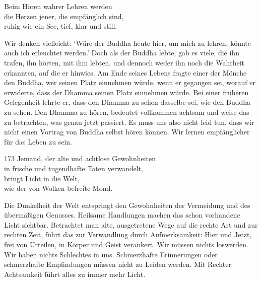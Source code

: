 
\begin{dhpVerse}{82}
\label{dhp-82}
Beim Hören wahrer Lehren werden\\ 
die Herzen jener, die empfänglich sind,\\ 
ruhig wie ein See, tief, klar und still. 
\end{dhpVerse}

\begin{dhpRefl}

Wir denken vielleicht: `Wäre der Buddha heute hier, um mich zu lehren, könnte
auch ich erleuchtet werden.’ Doch als der Buddha lebte, gab es viele, die ihn
trafen, ihn hörten, mit ihm lebten, und dennoch weder ihn noch die Wahrheit
erkannten, auf die er hinwies. Am Ende seines Lebens fragte einer der Mönche
den Buddha, wer seinen Platz einnehmen würde, wenn er gegangen sei, worauf er
erwiderte, dass der Dhamma seinen Platz einnehmen würde. Bei einer früheren
Gelegenheit lehrte er, dass den Dhamma zu sehen dasselbe sei, wie den Buddha
zu sehen. Den Dhamma zu hören, bedeutet vollkommen achtsam und weise das zu
betrachten, was genau jetzt passiert. Es muss uns also nicht leid tun, dass
wir nicht einen Vortrag von Buddha selbst hören können. Wir lernen
empfänglicher für das Leben zu sein.

\end{dhpRefl}


\begin{dhpVerse}{173}
\label{dhp-173}
Jemand, der alte und achtlose Gewohnheiten\\ 
in frische und tugendhafte Taten verwandelt,\\ 
bringt Licht in die Welt,\\ 
wie der von Wolken befreite Mond. 
\end{dhpVerse}

\begin{dhpRefl}

Die Dunkelheit der Welt entspringt den Gewohnheiten der Vermeidung und des
übermäßigen Genusses. Heilsame Handlungen machen das schon vorhandene Licht
sichtbar. Betrachtet man alte, ausgetretene Wege auf die rechte Art und zur
rechten Zeit, führt das zur Verwandlung durch Aufmerksamkeit: Hier und Jetzt,
frei von Urteilen, in Körper und Geist verankert. Wir müssen nichts loswerden.
Wir haben nichts Schlechtes in uns. Schmerzhafte Erinnerungen oder
schmerzhafte Empfindungen müssen nicht zu Leiden werden. Mit Rechter
Achtsamkeit führt alles zu immer mehr Licht.

\end{dhpRefl}

